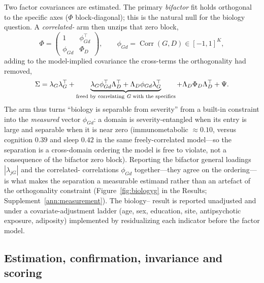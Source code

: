 Two factor covariances are estimated. The primary \emph{bifactor} fit holds \Gfac{}
orthogonal to the specific axes ($\Phi$ block-diagonal); this is the natural null for the
biology question. A \emph{correlated-\Gfac{}} arm then unzips that zero block,
\begin{equation}
  \Phi=\begin{pmatrix}1 & \phi_{Gd}^{\top}\\[2pt] \phi_{Gd} & \Phi_D\end{pmatrix},
  \qquad \phi_{Gd}=\operatorname{Corr}(G,D)\in[-1,1]^{K},
  \label{eq:corrg}
\end{equation}
adding to the model-implied covariance the cross-terms the orthogonality had removed,
\begin{equation}
  \Sigma=\lambda_G\lambda_G^{\top}
  +\underbrace{\lambda_G\phi_{Gd}^{\top}\Lambda_D^{\top}+\Lambda_D\phi_{Gd}\lambda_G^{\top}}_{\text{freed by correlating }\textit{G}{}\text{ with the specifics}}
  +\Lambda_D\Phi_D\Lambda_D^{\top}+\Psi .
  \label{eq:m-corrgsigma}
\end{equation}
The arm thus turns ``biology is separable from severity'' from a built-in constraint into the
\emph{measured} vector $\phi_{Gd}$: a domain is severity-entangled when its entry is
large and separable when it is near zero (immunometabolic $\approx 0.10$, versus cognition
$0.39$ and sleep $0.42$ in the same freely-correlated model---so the separation is a cross-domain ordering
the model is free to violate, not a consequence of the bifactor zero block). Reporting the bifactor general loadings
$|\lambda_{jG}|$ and the correlated-\Gfac{} correlations $\phi_{Gd}$ together---they
agree on the ordering---is what makes the separation a measurable estimand rather than an
artefact of the orthogonality constraint (Figure~\ref{fig:biologyg} in the Results;
Supplement~\ref{ann:measurement}). The biology--\Gfac{} result is reported unadjusted and
under a covariate-adjustment ladder (age, sex, education, site, antipsychotic exposure,
adiposity) implemented by residualizing each indicator before the factor model.

\subsection{Estimation, confirmation, invariance and scoring}

